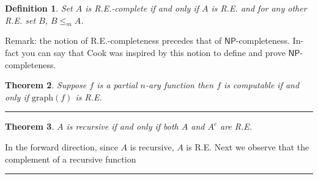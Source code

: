 \documentclass[twoside]{article}
\newcounter{lecnum}
\newtheorem{theorem}{Theorem}[lecnum]
\newtheorem{definition}[theorem]{Definition}
\newenvironment{proof}{{\bf Proof:}}{\hfill\rule{2mm}{2mm}}
\def\graph{\mbox{graph}}
\begin{document}
\begin{definition}
Set $A$ is R.E.-complete if and only if $A$ is R.E. and for any other R.E. set $B$, $B \leq_m A$. 
\end{definition}
Remark: the notion of R.E.-completeness precedes that of $\mathsf{NP}$-completeness. In-fact you can say that Cook was inspired by this notion to define and prove $\mathsf{NP}$-completeness.

\begin{theorem}
Suppose $f$ is a partial $n$-ary function then $f$ is computable if and only if $\graph(f)$ is R.E.
\end{theorem}
\begin{proof}

\end{proof}

\begin{theorem}
$A$ is recursive if and only if both $A$ and $A^c$ are R.E.
\end{theorem}
\begin{proof}
In the forward direction, since $A$ is recursive, $A$ is R.E. Next we observe that the complement of a recursive function  
\end{proof}
\end{document}
